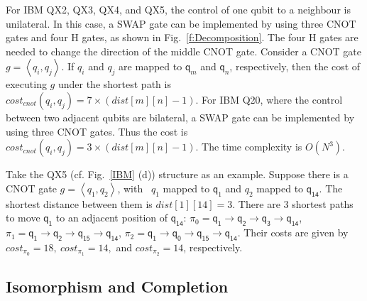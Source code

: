 \documentclass[runningheads]{llncs}
\begin{document}
For IBM QX2, QX3, QX4, and QX5, the control of one qubit to a neighbour is unilateral. In this case, 
a SWAP gate can be implemented by using three CNOT gates and four H gates, as shown in Fig.~\ref{f:Decomposition}. The four H gates are needed to change the direction of the middle CNOT gate. 
Consider a CNOT gate $g=\left \langle  \textit{q}_\textit{i},\textit{q}_\textit{j} \right \rangle $. If $q_i$ and $q_j$  are mapped to $\textsf{q}_{m}$ and $\textsf{q}_{n}$, respectively, then the cost of executing $g$ under the shortest path is $cost_{cnot}(\textit{q}_\textit{i},\textit{q}_\textit{j})=7 \times( dist[m][n]-1)$. For IBM Q20, where the control between two adjacent qubits are bilateral, a SWAP gate can be implemented by using three CNOT gates. Thus the cost  is $cost_{cnot}(\textit{q}_\textit{i},\textit{q}_\textit{j})=3 \times( dist[m][n]-1)$. The time complexity is $O (N^{3})$.
\begin{example}
	Take the QX5 (cf. Fig.~\ref{IBM} (d))    structure  as an example. Suppose there is a CNOT gate $g=\left \langle  \textit{q}_\textit{1}, \textit{q}_\textit{2} \right \rangle $, with \ $\textit{q}_\textit{1}$ mapped to $\textsf{q}_{1}$ and $\textit{q}_\textit{2}$ mapped to $\textsf{q}_{\textsf{14}}$. The shortest distance between them  is $dist[1][14]=3$. There are 3 shortest paths to move $\textsf{q}_{\textsf{1}}$ to an adjacent position of 
$\textsf{q}_{\textsf{14}}$:
$\pi_{0}={\textsf{q}_{\textsf{1}}\rightarrow \textsf{q}_{\textsf{2}} \rightarrow \textsf{q}_{\textsf{3}} \rightarrow \textsf{q}_{\textsf{14}}}$,
$\pi_{1}={\textsf{q}_{\textsf{1}}\rightarrow \textsf{q}_{\textsf{2}} \rightarrow \textsf{q}_{\textsf{15}} \rightarrow \textsf{q}_{\textsf{14}}}$,
$\pi_{2}={\textsf{q}_{\textsf{1}}\rightarrow \textsf{q}_{\textsf{0}} \rightarrow \textsf{q}_{\textsf{15}} \rightarrow \textsf{q}_{\textsf{14}}}$.
Their costs are given by 
$cost_{\pi_{0}}=18,\ cost_{\pi_{1}}=14,$ and $ cost_{\pi_{2}}=14$, respectively.
\end{example}



\subsection{Isomorphism and Completion}
\end{document}
